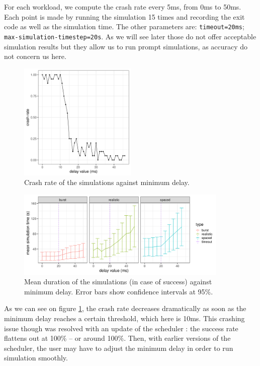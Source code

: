 For each workload, we compute the crash rate every 5ms, from 0ms to 50ms. Each
point is made by running the simulation 15 times and recording the exit code as
well as the simulation time. The other parameters are: \texttt{timeout=20ms};
\texttt{max-simulation-timestep=20s}. As we will see later those do not offer
acceptable simulation results but they allow us to run prompt simulations, as
accuracy do not concern us here.\\

\begin{figure}
	\centering
	\includegraphics[width=0.5\textwidth]{imgs/min-delay_crash_old.png}
	\caption{Crash rate of the simulations against minimum delay.}
	\label{fig:min-delay_crash}
\end{figure}

\begin{figure}
	\centering
	\includegraphics[width=0.9\textwidth]{imgs/min-delay_duration.png}
	\caption{Mean duration of the simulations (in case of success) against minimum delay. Error bars show confidence intervals at 95\%.}
	\label{fig:min-delay_duration}
\end{figure}

As we can see on figure \ref{fig:min-delay_crash}, the crash rate decreases
dramatically as soon as the minimum delay reaches a certain threshold, which
here is 10ms.  This crashing issue though was resolved with an update of the
scheduler : the success rate flattens out at 100\% -- or around 100\%. Then,
with earlier versions of the scheduler, the user may have to adjust the minimum
delay in order to run simulation smoothly. 

